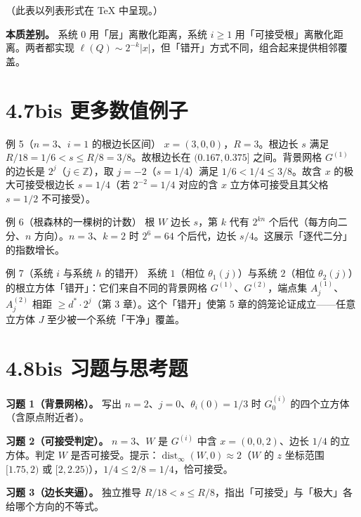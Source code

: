 \documentclass[a4paper,11pt,openany]{ctexbook}
\numberwithin{equation}{chapter}
\numberwithin{figure}{chapter}
\numberwithin{table}{chapter}
\begin{document}
（此表以列表形式在 TeX 中呈现。）

\textbf{本质差别。} 系统 0 用「层」离散化距离，系统 $i\ge1$ 用「可接受根」离散化距离。两者都实现 $\ell(Q)\sim2^{-k}|x|$，但「错开」方式不同，组合起来提供相邻覆盖。

\section{4.7bis 更多数值例子}

\begin{examplebox}{例 5（$n=3$、$i=1$ 的根边长区间）}
$x=(3,0,0)$，$R=3$。根边长 $s$ 满足 $R/18=1/6<s\le R/8=3/8$。故根边长在 $(0.167,0.375]$ 之间。背景网格 $G^{(1)}$ 的边长是 $2^j$（$j\in\mathbb Z$），取 $j=-2$（$s=1/4$）满足 $1/6<1/4\le3/8$。故含 $x$ 的极大可接受根边长 $s=1/4$（若 $2^{-2}=1/4$ 对应的含 $x$ 立方体可接受且其父格 $s=1/2$ 不可接受）。
\end{examplebox}

\begin{examplebox}{例 6（根森林的一棵树的计数）}
根 $W$ 边长 $s$，第 $k$ 代有 $2^{kn}$ 个后代（每方向二分、$n$ 方向）。$n=3$、$k=2$ 时 $2^{6}=64$ 个后代，边长 $s/4$。这展示「逐代二分」的指数增长。
\end{examplebox}

\begin{examplebox}{例 7（系统 $i$ 与系统 $h$ 的错开）}
系统 $1$（相位 $\theta_1(j)$）与系统 $2$（相位 $\theta_2(j)$）的根立方体「错开」：它们来自不同的背景网格 $G^{(1)}$、$G^{(2)}$，端点集 $A_j^{(1)}$、$A_j^{(2)}$ 相距 $\ge d^*\cdot2^j$（第 3 章）。这个「错开」使第 5 章的鸽笼论证成立——任意立方体 $J$ 至少被一个系统「干净」覆盖。
\end{examplebox}

\section{4.8bis 习题与思考题}

\textbf{习题 1（背景网格）。} 写出 $n=2$、$j=0$、$\theta_i(0)=1/3$ 时 $G_0^{(i)}$ 的四个立方体（含原点附近者）。

\textbf{习题 2（可接受判定）。} $n=3$、$W$ 是 $G^{(i)}$ 中含 $x=(0,0,2)$、边长 $1/4$ 的立方体。判定 $W$ 是否可接受。提示：$\operatorname{dist}_\infty(W,0)\approx2$（$W$ 的 $z$ 坐标范围 $[1.75,2)$ 或 $[2,2.25)$），$1/4\le2/8=1/4$，恰可接受。

\textbf{习题 3（边长夹逼）。} 独立推导 $R/18<s\le R/8$，指出「可接受」与「极大」各给哪个方向的不等式。
\end{document}
